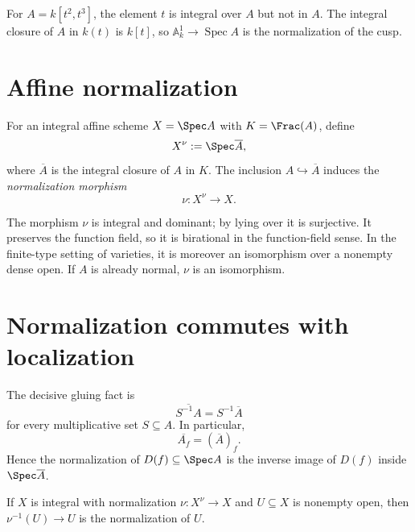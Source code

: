 

\begin{example}\label{ex:vi28-expand-01}
For $A=k[t^2,t^3]$, the element $t$ is integral over $A$ but not in $A$.  The integral closure of $A$ in $k(t)$ is $k[t]$, so $\mathbb A^1_k\to\operatorname{Spec}A$ is the normalization of the cusp.
\end{example}
\section{Affine normalization}
\begin{definition}\label{def:vi28-affine-normalization}
For an integral affine scheme $X=\Spec A$ with $K=\Frac(A)$, define
\[
X^\nu:=\Spec\overline A,
\]
where $\overline A$ is the integral closure of $A$ in $K$.  The inclusion $A\hookrightarrow\overline A$ induces
the \emph{normalization morphism}
\[
\nu:X^\nu\longrightarrow X.
\]
\end{definition}

The morphism $\nu$ is integral and dominant; by lying over it is surjective.  It preserves the function field, so it is birational in the function-field sense.  In the finite-type setting of varieties, it is moreover an isomorphism over a nonempty dense open.  If $A$ is already normal, $\nu$ is an isomorphism.



\section{Normalization commutes with localization}
The decisive gluing fact is
\[
\overline{S^{-1}A}=S^{-1}\overline A
\]
for every multiplicative set $S\subseteq A$.  In particular,
\[
\overline{A_f}=(\overline A)_f.
\]
Hence the normalization of $D(f)\subseteq\Spec A$ is the inverse image of $D(f)$ inside $\Spec\overline A$.

\begin{theorem}\label{thm:vi28-open-restriction}
If $X$ is integral with normalization $\nu:X^\nu\to X$ and $U\subseteq X$ is nonempty open, then
$\nu^{-1}(U)\to U$ is the normalization of $U$.
\end{theorem}



